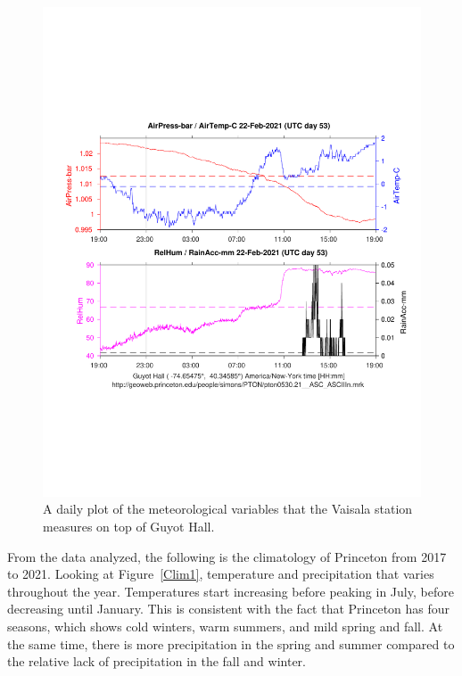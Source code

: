 \documentclass[11pt]{report}
\begin{document}
\begin{figure}[thb]
\centering \includegraphics[trim = 0.5cm 5.0cm 0.5cm 6.0cm,clip,width=1.0\textwidth]
{Figures/guyotweather_ywt_feb_22_2021.pdf}
\caption[Weather Station Data]{\label{daily}A daily plot of the
  meteorological variables that the Vaisala station measures on top
  of Guyot Hall.}
\end{figure}


From the data analyzed, the following is the climatology of Princeton from
2017 to 2021. Looking at Figure~\ref{Clim1}, temperature
and precipitation that varies throughout the year. Temperatures start
increasing before peaking in July, before decreasing until January. This is
consistent with the fact that Princeton has four seasons, which shows cold
winters, warm summers, and mild spring and fall. At the same time, there is
more precipitation in the spring and summer compared to the relative lack of
precipitation in the fall and winter.
\end{document}
